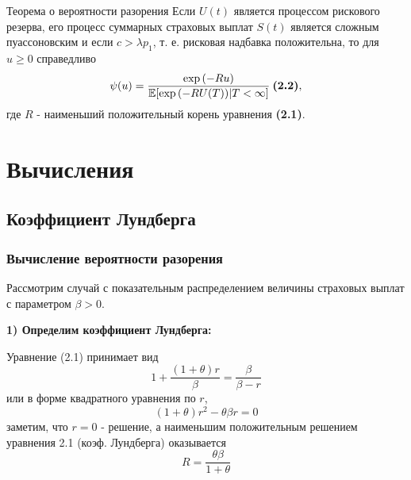 \documentclass[10pt]{beamer}
\newcommand\Exp{{\rm exp \,}}
\begin{document}
\begin{frame}
\begin{block}{Теорема о вероятности разорения}
Если $U(t)$ является процессом рискового резерва, его процесс суммарных страховых выплат $S(t)$ является сложным пуассоновским и если $c > \lambda p_{1}$, т. е. рисковая надбавка положительна, то для $u \geq 0$ справедливо $$
    \psi(u) = \frac{\Exp(-Ru)}{\mathbb{E}[\Exp(-RU(T))|T < \infty]} \: \textbf{(2.2)}, $$ где $R$ - наименьший положительный корень уравнения \textbf{(2.1)}.
\end{block}

\end{frame}


\section{Вычисления}
\subsection{Коэффициент Лундберга}
\begin{frame}
\frametitle{Вычисление вероятности разорения}
\noindent
Рассмотрим случай с показательным распределением величины страховых выплат с параметром $\beta > 0$.

\noindent
\textbf{1) Определим коэффициент Лундберга:}

\noindent
Уравнение (2.1) принимает вид
\begin{equation}
1 + \frac{(1 + \theta)r}{\beta}=\frac{\beta}{\beta-r}
\end{equation}
или в форме квадратного уравнения по $r$,
\begin{equation}
(1 + \theta)r^2 - \theta\beta r = 0
\end{equation}
заметим, что $r = 0$ - решение, а наименьшим положительным решением уравнения 2.1
(коэф. Лундберга) оказывается
\begin{equation}
R = \frac{\theta\beta}{1 + \theta}
\end{equation}
\end{frame}
\end{document}
